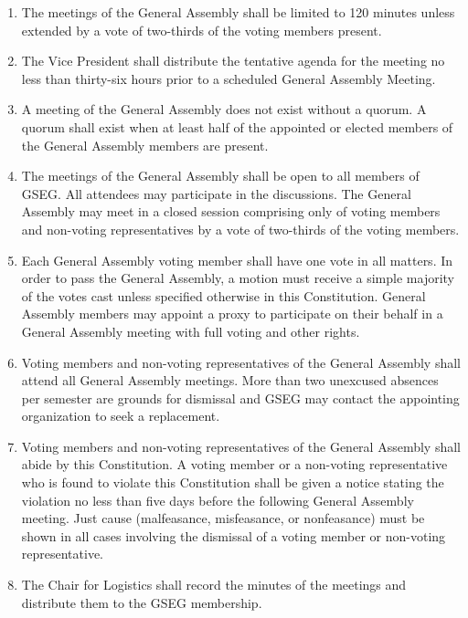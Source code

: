 \begin{enumerate}[label=\Alph*.]
	\item The meetings of the General Assembly shall be limited to 120 minutes unless extended
	by a vote of two-thirds of the voting members present.

	\item \label{assembly-vp} The Vice President shall distribute the tentative agenda for the meeting no less than
	thirty-six hours prior to a scheduled General Assembly Meeting.

	\item A meeting of the General Assembly does not exist without a quorum. A quorum shall exist
	when at least half of the appointed or elected members of the General Assembly members are
	present.

	\item The meetings of the General Assembly shall be open to all members of GSEG. All attendees
	may participate in the discussions. The General Assembly may meet in a closed session
	comprising only of voting members and non-voting representatives by a vote of two-thirds of the
	voting members.

	\item Each General Assembly voting member shall have one vote in all matters. In order to pass
	the General Assembly, a motion must receive a simple majority of the votes cast unless
	specified otherwise in this Constitution. General Assembly members may appoint a proxy to participate on their behalf in a General Assembly meeting with full voting and other rights.

	\item Voting members and non-voting representatives of the General Assembly shall attend all
	General Assembly meetings. More than two unexcused absences per semester are grounds for
	dismissal and GSEG may contact the appointing organization to seek a replacement.

	\item Voting members and non-voting representatives of the General Assembly shall abide by
	this Constitution. A voting member or a non-voting representative who is found to violate
	this Constitution shall be given a notice stating the violation no less
	than five days before the following General Assembly meeting. Just cause (malfeasance,
	misfeasance, or nonfeasance) must be shown in all cases involving the dismissal of a voting
	member or non-voting representative.

	\item \label{assembly-log} The Chair for Logistics shall record the minutes of the meetings and distribute them to
	the GSEG membership.

\end{enumerate}
